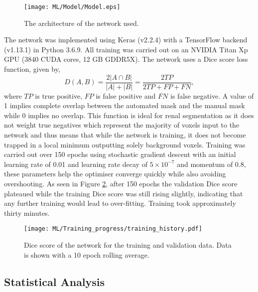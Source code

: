 \begin{figure}[h]
	\centering
	\texttt{[image: ML/Model/Model.eps]}
	\caption{The architecture of the network used.}
	\label{fig:ml_network}	
\end{figure}

The network was implemented using Keras (v2.2.4) \cite{chollet_keras_2015} with a TensorFlow backend (v1.13.1) \cite{abadi_tensorflow_2015} in Python 3.6.9. All training was carried out on an NVIDIA Titan Xp \ac{GPU} (3840 CUDA cores, 12 GB GDDR5X). The network uses a Dice score loss function, given by,
\begin{equation}
	D\left(A, B\right) = \frac{2\left| A \cap B \right|}{\left|A\right|+\left|B\right|} = \frac{2TP}{2TP + FP + FN},
	\label{eq:dice}
\end{equation} 
where $TP$ is true positive, $FP$ is false positive and $FN$ is false negative. A value of 1 implies complete overlap between the automated mask and the manual mask while 0 implies no overlap. This function is ideal for renal segmentation as it does not weight true negatives which represent the majority of voxels input to the network and thus means that while the network is training, it does not become trapped in a local minimum outputting solely background voxels. Training was carried out over 150 epochs using stochastic gradient descent with an initial learning rate of 0.01 and learning rate decay of $5\times10^{-7}$ and momentum of 0.8, these parameters help the optimiser converge quickly while also avoiding overshooting. As seen in Figure \ref{fig:ml_training_history}, after 150 epochs the validation Dice score plateaued while the training Dice score was still rising slightly, indicating that any further training would lead to over-fitting. Training took approximately thirty minutes.

\begin{figure}[h]
	\centering
	\texttt{[image: ML/Training\_progress/training\_history.pdf]}
	\caption{Dice score of the network for the training and validation data. Data is shown with a 10 epoch rolling average.}
	\label{fig:ml_training_history}	
\end{figure}

\newpage
\subsection{Statistical Analysis}

